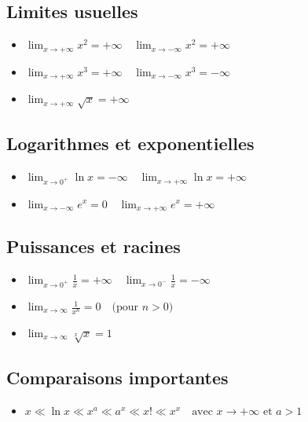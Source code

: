 \documentclass[12]{article}%
\theoremstyle{plain}
\theoremstyle{definition}
\theoremstyle{remark}
\begin{document}
\subsection{Limites usuelles}
\begin{itemize}
	\item \( \displaystyle \lim_{x \to +\infty} x^2 = +\infty \quad \lim_{x \to -\infty} x^2 = +\infty \)
	\item \( \displaystyle \lim_{x \to +\infty} x^3 = +\infty \quad \lim_{x \to -\infty} x^3 = -\infty \)
	\item \( \displaystyle \lim_{x \to +\infty} \sqrt{x} = +\infty \)
\end{itemize}


\subsection{Logarithmes et exponentielles}

\begin{itemize}
	\item \( \displaystyle \lim_{x \to 0^+} \ln x = -\infty \quad \lim_{x \to +\infty} \ln x = +\infty \)
	\item \( \displaystyle \lim_{x \to -\infty} e^x = 0 \quad \lim_{x \to +\infty} e^x = +\infty\)
\end{itemize}

\subsection{Puissances et racines}

\begin{itemize}
	\item \( \displaystyle \lim_{x \to 0^+} \frac{1}{x} = +\infty \quad \lim_{x \to 0^-} \frac{1}{x} = -\infty \)
	\item \( \displaystyle \lim_{x \to \infty} \frac{1}{x^n} = 0 \quad \text{(pour } n > 0 \text{)} \)
	\item \( \displaystyle \lim_{x \to \infty} \sqrt[x]{x} = 1 \)
\end{itemize}

\subsection{Comparaisons importantes}

\begin{itemize}
	\item \( x \ll \ln x \ll x^a \ll a^x \ll x! \ll x^x \quad \text{avec } x \to +\infty \text{ et } a > 1 \)
\end{itemize}
\end{document}
